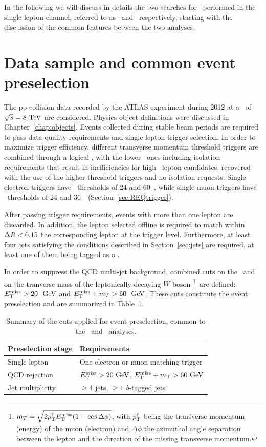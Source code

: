 In the following we will discuss in details the two searches for 
\TT\ performed in the single lepton channel,
referred to as \wbx\ and \htx\ respectively, starting with the
discussion of the common features between the two analyses.


\section{Data sample and common event preselection}\label{sec:presel}

The pp collision data recorded by the ATLAS experiment during
2012 at a \cme\ of $\rts=8\tev$ are considered. Physics object definitions 
were discussed in Chapter~\ref{chap:objects}.
Events collected during
stable beam periods are required to pass data quality requirements and
single lepton trigger selection. In order to maximize trigger
efficiency, different transverse momentum threshold triggers are combined
through a logical \OR, with the lower \pt\ ones including isolation requirements
that result in inefficiencies for high \pt\ lepton candidates, recovered with
the use of the higher threshold triggers and 
no isolation requests. Single electron triggers have
\pt\ thresholds of 24 and 60~\gev, while
single muon triggers have \pt\ thresholds  
of 24 and 36~\gev\ (Section~\ref{sec:REQtrigger}).

After passing trigger requirements, events with more than one lepton are
discarded. In addition, the lepton selected offline is required
to match within $\dr<0.15$ the corresponding lepton at the
trigger level. Furthermore, at least four jets satisfying the conditions
described in Section~\ref{sec:jets} are required, at least one of them
being tagged as a \bjet.

In order to suppress the QCD multi-jet background,
combined cuts on the \met\ and on the tranverse mass of the 
leptonically-decaying $W$ boson \mt\footnote{$\mt = \sqrt{2 p^\ell_{\rm T} \met (1-\cos\Delta\phi)}$, with
$p^\ell_{\rm T}$  being the transverse momentum (energy) of the 
muon (electron) and $\Delta\phi$ the
azimuthal angle separation between the lepton and the direction of
the missing transverse momentum.}\ 
are defined: $\met>20~\gev$ and $\met+\mt>60~\gev$.
These cuts constitute the event preselection and are summarized in
Table~\ref{tab:preselcuts}.

\begin{table}[tb]
\begin{center}
\begin{tabular}{ll}
\toprule
Preselection stage & Requirements \\
\midrule
Single lepton & One electron or muon matching trigger  \\
QCD rejection & $\met >20\gev$, $\met +m_{\rm T}>60\gev$ \\
Jet multiplicity & $\geq 4$ jets, $\geq 1$ $b$-tagged jets \\
\bottomrule\end{tabular}\caption{Summary of the cuts applied for 
event preselection, common to the \wbx\ and \htx\ analyses.}\label{tab:preselcuts}
\end{center}
\end{table}


